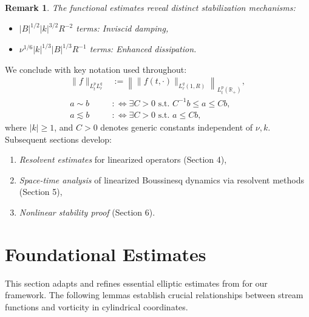 \documentclass[final, 12pt,reqno]{amsart}
\newtheorem{remark}{\bf Remark}[section]
\numberwithin{equation}{section}
\begin{document}
\begin{remark}
The functional estimates reveal distinct stabilization mechanisms:
\begin{itemize}
\item $|B|^{1/2}|k|^{3/2}R^{-2}$ terms: \textit{Inviscid damping},
\item $\nu^{1/6}|k|^{1/3}|B|^{1/3} R^{-1}$ terms: \textit{Enhanced dissipation}.
\end{itemize}
\end{remark}
We conclude with key notation used throughout:
\begin{align*}
\|f\|_{L_t^p L_r^q} &:= \left\| \|f(t,\cdot)\|_{L_r^q(1,R)} \right\|_{L_t^p(\mathbb{R}_+)}, \\
a \sim b &:\Leftrightarrow \exists C>0 \text{ s.t. } C^{-1}b \leq a \leq Cb, \\
a \lesssim b &:\Leftrightarrow \exists C>0 \text{ s.t. } a \leq Cb,
\end{align*}
where $|k| \geq 1$, and $C > 0$ denotes generic constants independent of $\nu, k$. Subsequent sections develop:
\begin{enumerate}
\item \textit{Resolvent estimates} for linearized operators (Section 4),
\item \textit{Space-time analysis} of linearized Boussinesq dynamics via resolvent methods (Section 5),
\item \textit{Nonlinear stability proof} (Section 6).
\end{enumerate}

  \section{Foundational Estimates}
This section adapts and refines essential elliptic estimates from \cite{An.2024} for our framework. The following lemmas establish crucial relationships between stream functions and vorticity in cylindrical coordinates.
\end{document}
